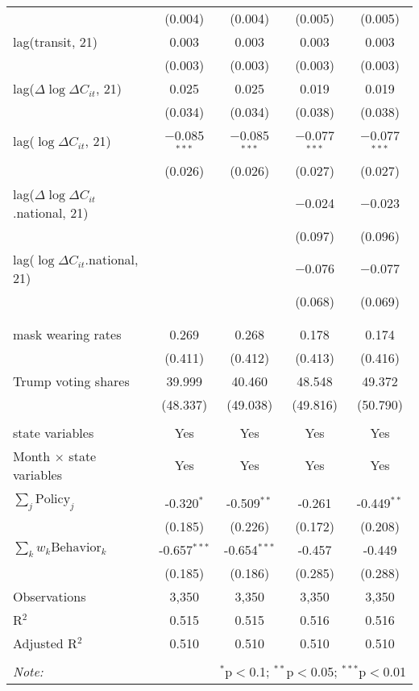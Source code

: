 \begin{tabular}{@{\extracolsep{1pt}}lcccc}
  & (0.004) & (0.004) & (0.005) & (0.005) \\ 
  lag(transit, 21) & 0.003 & 0.003 & 0.003 & 0.003 \\ 
  & (0.003) & (0.003) & (0.003) & (0.003) \\ 
  lag($\Delta \log \Delta C_{it}$, 21) & 0.025 & 0.025 & 0.019 & 0.019 \\ 
  & (0.034) & (0.034) & (0.038) & (0.038) \\ 
  lag($\log \Delta C_{it}$, 21) & $-$0.085$^{***}$ & $-$0.085$^{***}$ & $-$0.077$^{***}$ & $-$0.077$^{***}$ \\ 
  & (0.026) & (0.026) & (0.027) & (0.027) \\ 
  lag($\Delta \log \Delta C_{it}$.national, 21) &  &  & $-$0.024 & $-$0.023 \\ 
  &  &  & (0.097) & (0.096) \\ 
  lag($\log \Delta C_{it}$.national, 21) &  &  & $-$0.076 & $-$0.077 \\ 
  &  &  & (0.068) & (0.069) \\ 
   &  &  &  &  \\ 
  &  &  &  &  \\ 
  mask wearing rates & 0.269 & 0.268 & 0.178 & 0.174 \\ 
  & (0.411) & (0.412) & (0.413) & (0.416) \\ 
  Trump voting shares & 39.999 & 40.460 & 48.548 & 49.372 \\ 
  & (48.337) & (49.038) & (49.816) & (50.790) \\ 
 \hline \\[-1.8ex] 
state variables & Yes & Yes & Yes & Yes \\ 
Month $\times$ state variables & Yes & Yes & Yes & Yes \\ 
\hline \\[-1.8ex] 
$\sum_j \mathrm{Policy}_j$ & -0.320$^{*}$ & -0.509$^{**}$ & -0.261 & -0.449$^{**}$ \\ 
 & (0.185) & (0.226) & (0.172) & (0.208) \\ 
$\sum_k w_k \mathrm{Behavior}_k$ & -0.657$^{***}$ & -0.654$^{***}$ & -0.457 & -0.449 \\ 
 & (0.185) & (0.186) & (0.285) & (0.288) \\ 
Observations & 3,350 & 3,350 & 3,350 & 3,350 \\ 
R$^{2}$ & 0.515 & 0.515 & 0.516 & 0.516 \\ 
Adjusted R$^{2}$ & 0.510 & 0.510 & 0.510 & 0.510 \\ 
\hline 
\hline \\[-1.8ex] 
\textit{Note:}  & \multicolumn{4}{r}{$^{*}$p$<$0.1; $^{**}$p$<$0.05; $^{***}$p$<$0.01} \\ 
\end{tabular} 